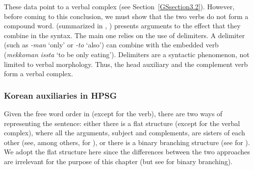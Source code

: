 These data point to a verbal complex (see Section~\ref{GSsection3.2}). However, before coming to this conclusion, we must show that the two verbs do not form a compound word. \citet{no1991case} (summarized in \citealt{Chung98a-u}, \citealt{Kim2016a-u}) presents arguments to the effect that they combine in the syntax. The main one relies on the use of delimiters. A delimiter (such as \emph{-man} `only' or \emph{-to} `also') can combine with the embedded verb (\eg \emph{mekkoman issta} `to be only eating'). Delimiters are a syntactic phenomenon, not limited to verbal morphology. 
%
%	
Thus, the head auxiliary and the complement verb form a verbal complex.

\subsubsection{Korean auxiliaries in HPSG}\label{GSsection4.2.3}

Given the free word order in  (except for the verb), there are two ways of representing the sentence: either there is a flat structure (except for the verbal complex), where all the arguments, subject and complements, are sisters of each other (see, among others, \citealt{Chung98a-u} for ), or there is a binary branching structure (see \citealt{Kim2016a-u} for ). We adopt the flat structure here since the differences between the two approaches are irrelevant for the purpose of this chapter (but see  for binary branching).


